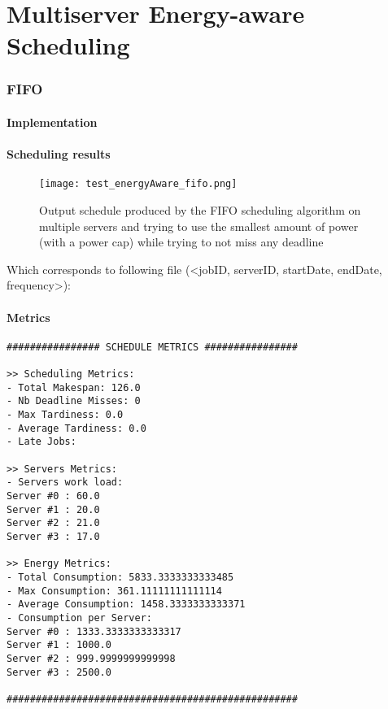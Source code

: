 \documentclass[./report.tex]{subfiles}
\begin{document}
\part{Multiserver Energy-aware Scheduling}


\newpage
\section{FIFO}
\subsection{Implementation}

\newpage
\subsection{Scheduling results}
\begin{figure}[!h]
	\center
	\texttt{[image: test\_energyAware\_fifo.png]}
	\caption{Output schedule produced by the FIFO scheduling algorithm on multiple servers and trying to use the smallest amount of power (with a power cap) while trying to not miss any deadline}
	\label{fig:energyAware_fifo} 
\end{figure}

Which corresponds to following file (<jobID, serverID, startDate, endDate, frequency>):


\newpage
\subsection{Metrics}
\begin{lstlisting}[style=txt, caption={Metrics for FIFO on multiple energy aware servers}]
################ SCHEDULE METRICS ################

>> Scheduling Metrics: 
- Total Makespan: 126.0
- Nb Deadline Misses: 0
- Max Tardiness: 0.0
- Average Tardiness: 0.0
- Late Jobs: 

>> Servers Metrics: 
- Servers work load:
Server #0 : 60.0
Server #1 : 20.0
Server #2 : 21.0
Server #3 : 17.0

>> Energy Metrics: 
- Total Consumption: 5833.3333333333485
- Max Consumption: 361.11111111111114
- Average Consumption: 1458.3333333333371
- Consumption per Server: 
Server #0 : 1333.3333333333317
Server #1 : 1000.0
Server #2 : 999.9999999999998
Server #3 : 2500.0

##################################################
\end{lstlisting}
\end{document}
